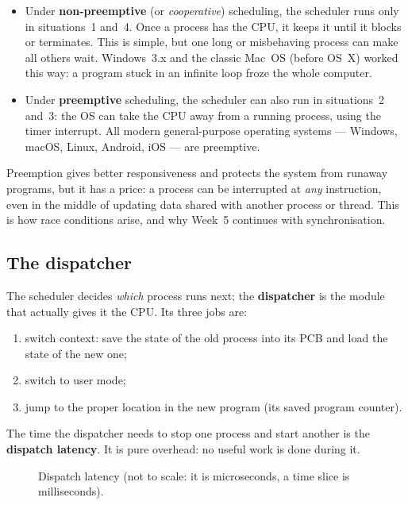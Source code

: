 \documentclass[11pt,a4paper]{article}
\newcommand{\term}[1]{\textbf{\color{mintdeep}#1}}
\begin{document}
\begin{itemize}
  \item Under \term{non-preemptive} (or \emph{cooperative}) scheduling, the scheduler runs only in situations~1 and~4. Once a process has the CPU, it keeps it until it blocks or terminates. This is simple, but one long or misbehaving process can make all others wait. Windows~3.x and the classic Mac~OS (before OS~X) worked this way: a program stuck in an infinite loop froze the whole computer.
  \item Under \term{preemptive} scheduling, the scheduler can also run in situations~2 and~3: the OS can take the CPU away from a running process, using the timer interrupt. All modern general-purpose operating systems --- Windows, macOS, Linux, Android, iOS --- are preemptive.
\end{itemize}

Preemption gives better responsiveness and protects the system from runaway programs, but it has a price: a process can be interrupted at \emph{any} instruction, even in the middle of updating data shared with another process or thread. This is how race conditions arise, and why Week~5 continues with synchronisation.

\subsection{The dispatcher}

The scheduler decides \emph{which} process runs next; the \term{dispatcher} is the module that actually gives it the CPU. Its three jobs are:
\begin{enumerate}[leftmargin=1.4em]
  \item switch context: save the state of the old process into its PCB and load the state of the new one;
  \item switch to user mode;
  \item jump to the proper location in the new program (its saved program counter).
\end{enumerate}

The time the dispatcher needs to stop one process and start another is the \term{dispatch latency}. It is pure overhead: no useful work is done during it.

\begin{figure}[H]
\centering
{}
\caption{Dispatch latency (not to scale: it is microseconds, a time slice is milliseconds).}
\end{figure}
\end{document}
